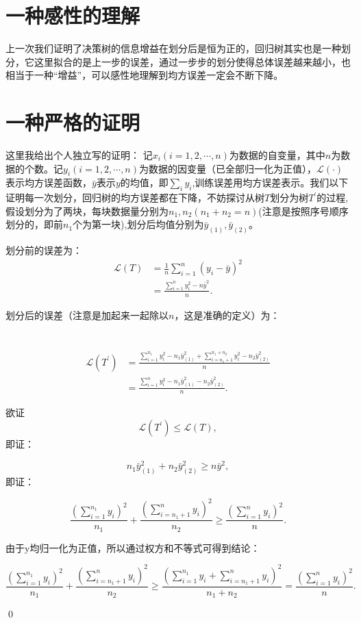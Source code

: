 \documentclass{article}
\title{\Huge\Assignment}
\author{\ID \Name \quad\href{mailto:tianym2022@smail.nju.edu.cn}{\color{magenta}\Email}}
\date{\today}
\newcommand{\hs}[1]{\hspace{{#1}em}} %
\begin{document}
	\maketitle
	
	\section{一种感性的理解}
	\hs{2}上一次我们证明了决策树的信息增益在划分后是恒为正的，回归树其实也是一种划分，它这里拟合的是上一步的误差，通过一步步的划分使得总体误差越来越小，也相当于一种“增益”，可以感性地理解到均方误差一定会不断下降。
	
	
	\section{一种严格的证明}
	\hs{2}这里我给出个人独立写的证明：
	记$x_i(i=1,2,\cdots,n)$为数据的自变量，其中$n$为数据的个数。记$y_i(i=1,2,\cdots,n)$为数据的因变量（{\color{red}已全部归一化为正值}），$\mathcal{L}(\cdot)$表示均方误差函数，$\bar{y}$表示$y$的均值，即$\sum_iy_i$,训练误差用均方误差表示。我们以下证明每一次划分，回归树的均方误差都在下降，不妨探讨从树$T$划分为树$T^\prime$的过程,假设划分为了两块，每块数据量分别为$n_1,n_2(n_1+n_2=n)$(注意是按照序号顺序划分的，即前$n_1$个为第一块),划分后均值分别为$\bar{y}_{(1)},\bar{y}_{(2)}$。
	
	划分前的误差为：
	\begin{align*}
		\mathcal{L}(T) &= \frac{1}{n}\sum_{i=1}^{n}(y_i-\bar{y})^2\\
		&= \frac{\sum_{i=1}^{n}y_i^2-n\bar{y}^2}{n}. 
	\end{align*}
	
	划分后的误差（注意是加起来一起除以$n$，这是准确的定义）为：\\\\\\
	
	\begin{align*}
		\mathcal{L}(T^\prime) &= \frac{\sum_{i=1}^{n_1}y_i^2-n_1\bar{y}_{(1)}^2+ \sum_{i=n_1+1}^{n_1+n_2}y_i^2-n_2\bar{y}_{(2)}^2}{n} \\
		&= \frac{\sum_{i=1}^{n}y_i^2-n_1\bar{y}_{(1)}^2-n_2\bar{y}_{(2)}^2}{n}.
	\end{align*}
	
	欲证\[\mathcal{L}(T^\prime) \leq \mathcal{L}(T),\]即证：
	
	\[n_1\bar{y}_{(1)}^2 + n_2\bar{y}_{(2)}^2 \geq n\bar{y}^2,\]即证：
	
	\[\frac{{(\sum_{i=1}^{n_1}y_i)}^2}{n_1} + \frac{{(\sum_{i=n_1+1}^{n}y_i)}^2}{n_2} \geq \frac{{(\sum_{i=1}^{n}y_i)}^2}{n}.\]
	
	由于y均归一化为正值，所以通过权方和不等式可得到结论：
	
	\[\frac{{(\sum_{i=1}^{n_1}y_i)}^2}{n_1} + \frac{{(\sum_{i=n_1+1}^{n}y_i)}^2}{n_2}\geq \frac{{(\sum_{i=1}^{n_1}y_i+\sum_{i=n_1+1}^{n}y_i)}^2}{n_1+n_2} = \frac{{(\sum_{i=1}^{n}y_i)}^2}{n}.
	\]
	
	\qed
	
	
\end{document}
